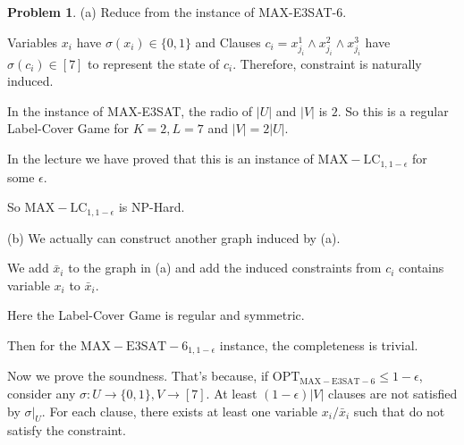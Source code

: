 \documentclass[a4paper]{article}
\theoremstyle{definition}
\newtheorem{problem}{Problem}
\theoremstyle{plain}
\newcommand{\<}{\left<}
\renewcommand{\>}{\right>}
\newcommand{\OPT}{\mathrm{OPT}}
\numberwithin{equation}{problem}
\begin{document}
\begin{problem}
    (a) Reduce from  the instance of MAX-E3SAT-6.

    \begin{center}
        \end{center}
        Variables  $ x_i $ have  $ \sigma(x_i)\in \{0,1\} $ and Clauses  $ c_i=x_{j_i}^1\wedge x_{j_i}^2\wedge x_{j_i}^3 $ have  $ \sigma(c_i)\in [7] $ to represent the state of  $ c_i $. Therefore, constraint is naturally induced.

        In the instance of MAX-E3SAT, the radio of  $ |U| $ and  $ |V| $ is  $ 2 $. So this is a regular Label-Cover Game for  $ K=2,L=7 $ and  $ |V|=2|U| $.
         
        In the lecture we have proved that this is an instance of  $ \mathrm{MAX-LC}_{1,1-\epsilon} $ for some  $ \epsilon $.  

        So $ \mathrm{MAX-LC}_{1,1-\epsilon} $ is NP-Hard.


    (b)
    We actually can construct another graph induced by (a).

    We add  $ \bar{x}_i $ to the graph in  (a) and add the induced constraints from  $ c_i $ contains variable  $ x_i $ to  $ \bar{x}_i $.   
        
    Here the Label-Cover Game is regular and symmetric.

    Then for the  $ \mathrm{MAX-E3SAT-6}_{1,1-\epsilon} $ instance, the completeness is trivial.
    
    Now we prove the soundness. That's because, if  $ \OPT_{\mathrm{MAX-E3SAT-6}} \leq 1-\epsilon $, consider any  $ \sigma:U\rightarrow \{0,1\},V\rightarrow [7] $. At least  $ (1-\epsilon)|V| $ clauses are not satisfied by  $ \sigma|_U $. For each clause, there exists at least one variable  $ x_i/\bar{x}_i $ such that do not satisfy the constraint.
    

\end{problem}
\end{document}
